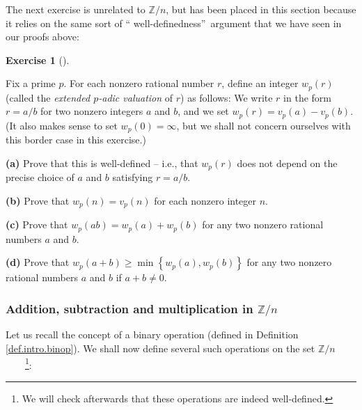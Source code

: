 \documentclass[numbers=enddot,12pt,final,onecolumn,notitlepage]{scrartcl}%
\newcounter{exer}
\numberwithin{exer}{subsection}
\theoremstyle{definition}
\newtheorem{exmp}[exer]{Exercise}
\newenvironment{exercise}[1][]
{\begin{exmp}[#1]\begin{leftbar}}
{\end{leftbar}\end{exmp}}
\begin{document}
The next exercise is unrelated to $\mathbb{Z}/n$, but has been placed in this
section because it relies on the same sort of \textquotedblleft
well-definedness\textquotedblright\ argument that we have seen in our proofs above:

\begin{exercise}
\label{exe.eqrel.quot.wp}Fix a prime $p$. For each nonzero rational number
$r$, define an integer $w_{p}\left(  r\right)  $ (called the \textit{extended
$p$-adic valuation} of $r$) as follows: We write $r$ in the form $r=a/b$ for
two nonzero integers $a$ and $b$, and we set $w_{p}\left(  r\right)
=v_{p}\left(  a\right)  -v_{p}\left(  b\right)  $. (It also makes sense to set
$w_{p}\left(  0\right)  =\infty$, but we shall not concern ourselves with this
border case in this exercise.)

\textbf{(a)} Prove that this is well-defined -- i.e., that $w_{p}\left(
r\right)  $ does not depend on the precise choice of $a$ and $b$ satisfying
$r=a/b$.

\textbf{(b)} Prove that $w_{p}\left(  n\right)  =v_{p}\left(  n\right)  $ for
each nonzero integer $n$.

\textbf{(c)} Prove that $w_{p}\left(  ab\right)  =w_{p}\left(  a\right)
+w_{p}\left(  b\right)  $ for any two nonzero rational numbers $a$ and $b$.

\textbf{(d)} Prove that $w_{p}\left(  a+b\right)  \geq\min\left\{
w_{p}\left(  a\right)  ,w_{p}\left(  b\right)  \right\}  $ for any two nonzero
rational numbers $a$ and $b$ if $a+b\neq0$.
\end{exercise}

\subsubsection{Addition, subtraction and multiplication in $\mathbb{Z}/n$}

Let us recall the concept of a binary operation (defined in Definition
\ref{def.intro.binop}). We shall now define several such operations on the set
$\mathbb{Z}/n$\ \ \ \ \footnote{We will check afterwards that these operations
are indeed well-defined.}:
\end{document}
